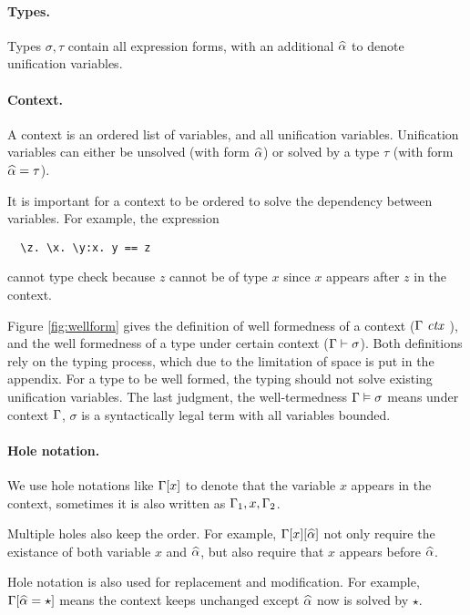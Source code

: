 \paragraph{Types.} Types $\sigma, \tau$ contain all expression forms, with an
additional $\widehat{\alpha}$ to denote unification variables.

\paragraph{Context.} A context is an ordered list of variables, and all
unification variables.
Unification variables can either be unsolved
(with form $\widehat{\alpha}$) or solved by a type $\tau$ (with form $\widehat{\alpha} = \tau$).

It is important for a context to be ordered to solve the dependency between
variables.
For example, the expression

\begin{lstlisting}
  \z. \x. \y:x. y == z
\end{lstlisting}

\noindent cannot type check because $z$ cannot be of type $x$ since $x$
appears after $z$ in the context.

Figure \ref{fig:wellform} gives the definition of well formedness of a context
($\Gamma \ \mathit{ctx}\ $),
and the well formedness of
a type under certain context ($\Gamma \vdash \sigma$).
Both definitions rely on the typing process,
which due to the limitation of space is put in the appendix.
For a type to be well formed, the typing should not solve existing unification
variables.
The last judgment, the
well-termedness
$\Gamma \vDash \sigma$ means under context $\Gamma$, $\sigma$ is a syntactically
legal term with all variables bounded.

\paragraph{Hole notation.} We use hole notations like $\Gamma[x]$ to
denote that the variable $x$ appears in the context, sometimes it is also
written as $\Gamma_1, x, \Gamma_2$.

Multiple holes also keep the order. For example, $\Gamma[x][\widehat{\alpha}]$ not only
require the existance of both variable $x$ and $\widehat{\alpha}$, but also require that
$x$ appears before $\widehat{\alpha}$.

Hole notation is also used for replacement and modification. For example,
$\Gamma[\widehat{\alpha} = \star]$ means the context keeps unchanged except $\widehat{\alpha}$
now is solved by $\star$.

